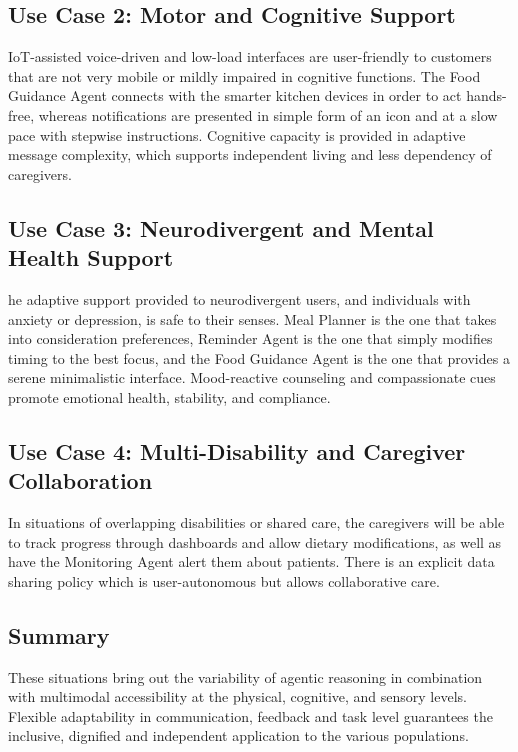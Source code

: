 \documentclass[pdflatex,sn-mathphys-num]{sn-jnl}
\begin{document}
\subsection{Use Case 2: Motor and Cognitive Support}
IoT-assisted voice-driven and low-load interfaces are user-friendly to customers that are not very mobile or mildly impaired in cognitive functions. The Food Guidance Agent connects with the smarter kitchen devices in order to act hands-free, whereas notifications are presented in simple form of an icon and at a slow pace with stepwise instructions. Cognitive capacity is provided in adaptive message complexity, which supports independent living and less dependency of caregivers.

\subsection{Use Case 3: Neurodivergent and Mental Health Support}
he adaptive support provided to neurodivergent users, and individuals with anxiety or depression, is safe to their senses. Meal Planner is the one that takes into consideration preferences, Reminder Agent is the one that simply modifies timing to the best focus, and the Food Guidance Agent is the one that provides a serene minimalistic interface. Mood-reactive counseling and compassionate cues promote emotional health, stability, and compliance.

\subsection{Use Case 4: Multi-Disability and Caregiver Collaboration}
In situations of overlapping disabilities or shared care, the caregivers will be able to track progress through dashboards and allow dietary modifications, as well as have the Monitoring Agent alert them about patients. There is an explicit data sharing policy which is user-autonomous but allows collaborative care.

\subsection{Summary}

These situations bring out the variability of agentic reasoning in combination with multimodal accessibility at the physical, cognitive, and sensory levels. Flexible adaptability in communication, feedback and task level guarantees the inclusive, dignified and independent application to the various populations.
\end{document}
